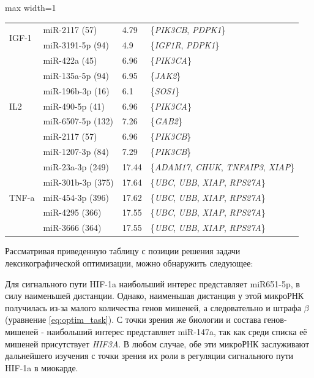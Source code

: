 \begin{table}[ht]
\begin{adjustbox}{max width=1\textwidth}
\begin{tabular}{p{3cm}lll}
    \multirow{2}{*}{IGF-1} & miR-2117 (57) & 4.79 & \{\textit{PIK3CB}, \textit{PDPK1}\} \\
     & miR-3191-5p (94) & 4.9 & \{\textit{IGF1R}, \textit{PDPK1}\} \\
    \midrule
    
    \multirow{7}{*}{IL2} & miR-422a (45) & 6.96 & \{\textit{PIK3CA}\} \\
     & miR-135a-5p (94) & 6.95 & \{\textit{JAK2}\} \\
     & miR-196b-3p (16) & 6.1 & \{\textit{SOS1}\} \\
     & miR-490-5p (41) & 6.96 & \{\textit{PIK3CA}\} \\
     & miR-6507-5p (132) & 7.26 & \{\textit{GAB2}\} \\
     & miR-2117 (57) & 6.96 & \{\textit{PIK3CB}\} \\
     & miR-1207-3p (84) & 7.29 & \{\textit{PIK3CB}\} \\
    \midrule
    
    \multirow{5}{*}{TNF-a} & miR-23a-3p (249) & 17.44 & \{\textit{ADAM17}, \textit{CHUK}, \textit{TNFAIP3}, \textit{XIAP}\} \\
     & miR-301b-3p (375) & 17.64 & \{\textit{UBC}, \textit{UBB}, \textit{XIAP}, \textit{RPS27A}\} \\
     & miR-454-3p (396) & 17.62 & \{\textit{UBC}, \textit{UBB}, \textit{XIAP}, \textit{RPS27A}\} \\
     & miR-4295 (366) & 17.55 & \{\textit{UBC}, \textit{UBB}, \textit{XIAP}, \textit{RPS27A}\} \\
     & miR-3666 (364) & 17.55 & \{\textit{UBC}, \textit{UBB}, \textit{XIAP}, \textit{RPS27A}\} \\
    \bottomrule
    \end{tabular}
    \end{adjustbox}
    \end{table}

Рассматривая приведенную таблицу с позиции решения задачи лексикографической оптимизации, можно обнаружить следующее:

Для сигнального пути HIF-1a наибольший интерес представляет miR651-5p, в силу наименьшей дистанции. Однако, наименьшая дистанция у этой микроРНК получилась из-за малого количества генов мишеней, а следовательно и штрафа $\beta$ (уравнение \ref{eq:optim_task}). С точки зрения же биологии и состава генов-мишеней - наибольший интерес представляет miR-147a, так как среди списка её мишеней присутствует \textit{HIF3A}. В любом случае, обе эти микроРНК заслуживают дальнейшего изучения с точки зрения их роли в регуляции сигнального пути HIF-1a в миокарде.


